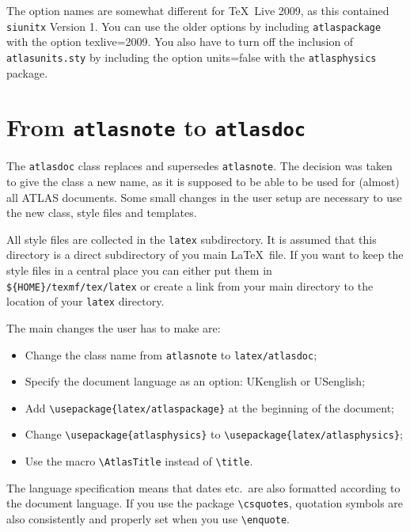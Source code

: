 \documentclass[UKenglish]{latex/atlasdoc}
\newcommand{\File}[1]{\texttt{#1}\xspace}
\newcommand{\Macro}[1]{\texttt{\textbackslash #1}\xspace}
\newcommand{\Option}[1]{\textsf{#1}\xspace}
\newcommand{\Package}[1]{\texttt{#1}\xspace}
\begin{document}
The option names are somewhat different for \TeX\ Live 2009,
as this contained \Package{siunitx} Version 1.
You can use the older options by including \Package{atlaspackage} with the 
option \Option{texlive=2009}.
You also have to turn off the inclusion of \File{atlasunits.sty} by including the option \Option{units=false} with
the \Package{atlasphysics} package.


\section{From \texttt{atlasnote} to \texttt{atlasdoc}}
\label{sec:oldnote}

The \texttt{atlasdoc} class replaces and supersedes \texttt{atlasnote}.
The decision was taken to give the class a new name, as it is supposed to be
able to be used for (almost) all ATLAS documents.
Some small changes in the user setup are necessary to use the new
class, style files and templates.

All style files are collected in the \texttt{latex} subdirectory.
It is assumed that this directory is a direct subdirectory of you main \LaTeX\ file.
If you want to keep the style files in a central place you can either put them in
\verb|${HOME}/texmf/tex/latex| or create a link from your main directory to the location of
your \texttt{latex} directory.

The main changes the user has to make are:
\begin{itemize}
\item Change the class name from \texttt{atlasnote} to \texttt{latex/atlasdoc};
\item Specify the document language as an option: UKenglish or USenglish;
\item Add \verb|\usepackage{latex/atlaspackage}| at the beginning of the document;
\item Change \verb|\usepackage{atlasphysics}| to \verb|\usepackage{latex/atlasphysics}|; 
\item Use the macro \Macro{AtlasTitle} instead of \Macro{title}.
\end{itemize}

The language specification means that dates etc.\ are also formatted according to 
the document language. 
If you use the package \Macro{csquotes}, quotation symbols are also consistently and properly set
when you use \Macro{enquote}.
\end{document}
